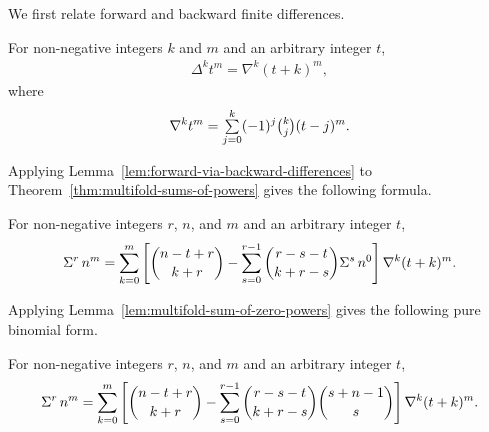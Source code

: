 We first relate forward and backward finite differences.
\begin{lemma}
  \label{lem:forward-via-backward-differences}
  For non-negative integers $k$ and $m$ and an arbitrary integer $t$,
  \begin{align*}
    \Delta^{k} t^{m} = \nabla^{k} (t+k)^{m},
  \end{align*}
  where
  \begin{align*}
    \nabla^{k} t^{m} = \mathop{\textstyle\sum}_{j=0}^{k} (-1)^j \tbinom{k}{j} (t-j)^m.
  \end{align*}
\end{lemma}
Applying Lemma~\eqref{lem:forward-via-backward-differences} to Theorem~\eqref{thm:multifold-sums-of-powers} gives the following formula.
\begin{proposition}
  \label{prop:multifold-backward-sums}
  For non-negative integers $r$, $n$, and $m$ and an arbitrary integer $t$,
  \begin{align*}
    \Sigma^{r}\,{n}^{m}
    = \sum_{k=0}^{m}
    \left[
      \binom{n-t+r}{k+r}
      -
      \sum_{s=0}^{r-1}
      \binom{r-s-t}{k+r-s}
      \Sigma^{s}\,{n}^{0}
    \right] \nabla^{k} (t+k)^{m}.
  \end{align*}
\end{proposition}
Applying Lemma~\eqref{lem:multifold-sum-of-zero-powers} gives the following pure binomial form.
\begin{proposition}
  \label{prop:multifold-backward-binomial-sums}
  For non-negative integers $r$, $n$, and $m$ and an arbitrary integer $t$,
  \begin{align*}
    \Sigma^{r}\,{n}^{m}
    = \sum_{k=0}^{m}
    \left[
      \binom{n-t+r}{k+r}
      -
      \sum_{s=0}^{r-1}
      \binom{r-s-t}{k+r-s}
      \binom{s+n-1}{s}
    \right] \nabla^{k} (t+k)^{m}.
  \end{align*}
\end{proposition}
